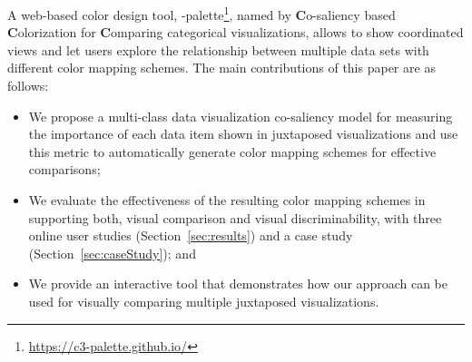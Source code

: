A web-based color design tool, \toolname-palette\footnote{\small \url{https://c3-palette.github.io/}}, named by \textbf{C}o-saliency based \textbf{C}olorization for \textbf{C}omparing categorical visualizations, allows to show coordinated views and let users  explore the relationship between multiple data sets with different color mapping schemes.
The main contributions of this paper are as follows:
\begin{itemize}[noitemsep]
\setlength{\itemsep}{5pt}
  \item We propose a multi-class data visualization co-saliency model for measuring the importance of each data item shown in juxtaposed visualizations and use this metric to automatically generate color mapping schemes for effective comparisons;
   \item
   We evaluate the effectiveness of the resulting color mapping schemes in supporting both, visual comparison and visual discriminability, with three online user studies (Section~\ref{sec:results}) and a case study (Section~\ref{sec:caseStudy}); and
    \item
  We provide an interactive tool that demonstrates how our approach can be used for visually comparing multiple juxtaposed visualizations.


\end{itemize}

